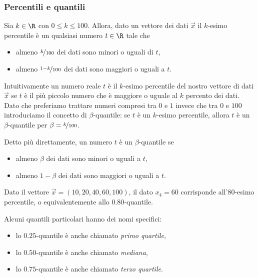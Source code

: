 \subsubsection{Percentili e quantili}
\begin{definition}
    [Percentile] Sia $k \in \R$ con $0 \leq k \leq 100$. Allora, dato un vettore dei dati $\vec x$ il $k$-esimo percentile è un qualsiasi numero $t \in \R$ tale che \begin{itemize}
        \item almeno $\nicefrac{k}{100}$ dei dati sono minori o uguali di $t$,
        \item almeno $\nicefrac{1-k}{100}$ dei dati sono maggiori o uguali a $t$.
    \end{itemize}
\end{definition}
Intuitivamente un numero reale $t$ è il $k$-esimo percentile del nostro vettore di dati $\vec x$ se $t$ è il più piccolo numero che è maggiore o uguale al $k$ percento dei dati. Dato che preferiamo trattare numeri compresi tra $0$ e $1$ invece che tra $0$ e $100$ introduciamo il concetto di $\beta$-quantile: se $t$ è un $k$-esimo percentile, allora $t$ è un $\beta$-quantile per $\beta = \nicefrac{k}{100}$.

Detto più direttamente, un numero $t$ è un $\beta$-quantile se \begin{itemize}
    \item almeno $\beta$ dei dati sono minori o uguali a $t$,
    \item almeno $1-\beta$ dei dati sono maggiori o uguali a $t$.
\end{itemize}

\begin{example}
    Dato il vettore $\vec x = (10, 20, 40, 60, 100)$, il dato $x_4 = 60$ corrisponde all'$80$-esimo percentile, o equivalentemente allo $0.80$-quantile.
\end{example}

Alcuni quantili particolari hanno dei nomi specifici:
\begin{itemize}
    \item lo $0.25$-quantile è anche chiamato \emph{primo quartile},
    \item lo $0.50$-quantile è anche chiamato \emph{mediana},
    \item lo $0.75$-quantile è anche chiamato \emph{terzo quartile}.
\end{itemize}

